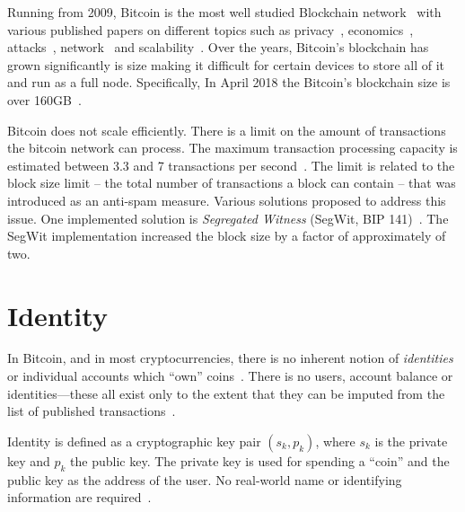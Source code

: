 Running from 2009, Bitcoin is the most well studied Blockchain network~\cite{10.1007/978-3-662-46803-6_10} with various published papers on different topics such as privacy~\cite{10.1007/978-3-319-70278-0_8, 10.1007/978-3-642-39884-1_2, Bonneau14e.w.:mixcoin, 10.1007/978-3-662-44774-1_9}, economics~\cite{Babaioff:2012:BRB:2229012.2229022, 10.1007/978-3-319-70278-0_17, Bentov2017DecentralizedPM, Carlsten:2016:IBW:2976749.2978408}, attacks~\cite{DBLP:journals_corr_Bahack13, DBLP:journals_corr_EyalS13}, network~\cite{10.1007/978-3-662-44774-1_7, 190890} and scalability~\cite{kiayias2017non, 10.1007/978-3-662-53357-4_5, 10.1007/978-3-662-53357-4_8}. Over the years, Bitcoin's blockchain has grown significantly is size making it difficult for certain devices to store all of it and run as a full node. Specifically, In April 2018 the Bitcoin's blockchain size is over 160GB~\cite{btc_bl_size}.

Bitcoin does not scale efficiently. There is a limit on the amount of transactions the bitcoin network can process. The maximum transaction processing capacity is estimated between 3.3 and 7 transactions per second~\cite{10.1007/978-3-662-53357-4_8}. The limit is related to the block size limit -- the total number of transactions a block can contain -- that was introduced as an anti-spam measure. Various solutions proposed to address this issue. One implemented solution is \textit{Segregated Witness} (SegWit, BIP 141)~\cite{segwit}. The SegWit implementation increased the block size by a factor of approximately of two.

\section{Identity}\label{blockchain:identity}

In Bitcoin, and in most cryptocurrencies, there is no inherent notion of \textit{identities} or individual accounts which ``own'' coins~\cite{7163021,nakamoto2012bitcoin}. There is no users, account balance or identities—these all exist only to the extent that they can be imputed from the list of published transactions~\cite{7163021,nakamoto2012bitcoin}.

Identity is defined as a cryptographic key pair $(s_k, p_k)$, where $s_k$ is the private key and $p_k$ the public key. The private key is used for spending a ``coin'' and the public key as the address of the user. No real-world name or identifying information are required~\cite{7163021,nakamoto2012bitcoin}.

